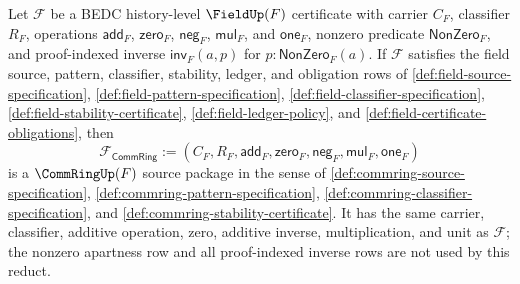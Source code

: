 \begin{theorem}
\label{thm:field-certificate-forgets-to-commring-certificate}
Let $\mathcal F$ be a BEDC history-level $\FieldUp(F)$ certificate with carrier
$C_F$, classifier $R_F$, operations
$\mathsf{add}_F$, $\mathsf{zero}_F$, $\mathsf{neg}_F$,
$\mathsf{mul}_F$, and $\mathsf{one}_F$, nonzero predicate
$\mathsf{NonZero}_F$, and proof-indexed inverse
$\mathsf{inv}_F(a,p)$ for $p:\mathsf{NonZero}_F(a)$. If $\mathcal F$
satisfies the field source, pattern, classifier, stability, ledger, and
obligation rows of \autoref{def:field-source-specification},
\autoref{def:field-pattern-specification},
\autoref{def:field-classifier-specification},
\autoref{def:field-stability-certificate},
\autoref{def:field-ledger-policy}, and
\autoref{def:field-certificate-obligations}, then
$$
\mathcal F_{\mathsf{CommRing}}:=
(C_F,R_F,\mathsf{add}_F,\mathsf{zero}_F,\mathsf{neg}_F,
\mathsf{mul}_F,\mathsf{one}_F)
$$
is a $\CommRingUp(F)$ source package in the sense of
\autoref{def:commring-source-specification},
\autoref{def:commring-pattern-specification},
\autoref{def:commring-classifier-specification}, and
\autoref{def:commring-stability-certificate}. It has the same carrier,
classifier, additive operation, zero, additive inverse, multiplication, and
unit as $\mathcal F$; the nonzero apartness row and all proof-indexed inverse
rows are not used by this reduct.
\end{theorem}
